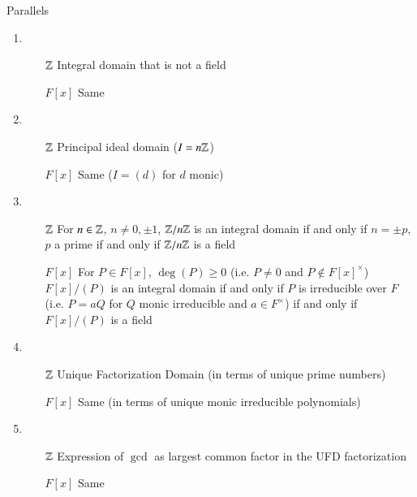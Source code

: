 \documentclass[12pt, a4paper, twoside, openright, titlepage]{book}
\begin{document}
\begin{rmk}{Parallels}{}
        \leavevmode
        \begin{enumerate}
                \item \begin{enumerate}
                                \item[$\mathbb Z$] Integral domain that is not a field
                                \item[${F[x]}$] Same
                \end{enumerate}
                \item \begin{enumerate}
                                \item[$\mathbb Z$] Principal ideal domain ($I = n\mathbb Z$)
                                \item[${F[x]}$] Same ($I = (d)$ for $d$ monic)
                \end{enumerate}
                \item \begin{enumerate}
                                \item[$\mathbb Z$] For $n \in \mathbb Z$, $n \neq 0, \pm 1$, $\mathbb Z/n\mathbb Z$ is an integral domain if and only if $n = \pm p$, $p$ a prime if and only if $\mathbb Z/n\mathbb Z$ is a field 
                                \item[${F[x]}$] For $P \in F[x]$, $\deg(P) \geq 0$ (i.e. $P \neq 0$ and $P \notin F[x]^{\times}$) $F[x]/(P)$ is an integral domain if and only if $P$ is irreducible over $F$ (i.e. $P = aQ$ for $Q$ monic irreducible and $a \in F^{\times}$) if and only if $F[x]/(P)$ is a field
                \end{enumerate}
                \item \begin{enumerate}
                                \item[$\mathbb Z$] Unique Factorization Domain (in terms of unique prime numbers) 
                                \item[${F[x]}$] Same (in terms of unique monic irreducible polynomials)
                \end{enumerate}
                \item \begin{enumerate}
                                \item[$\mathbb Z$] Expression of $\gcd$ as largest common factor in the UFD factorization
                                \item[${F[x]}$] Same
                \end{enumerate}
        \end{enumerate}
\end{rmk}
\end{document}
